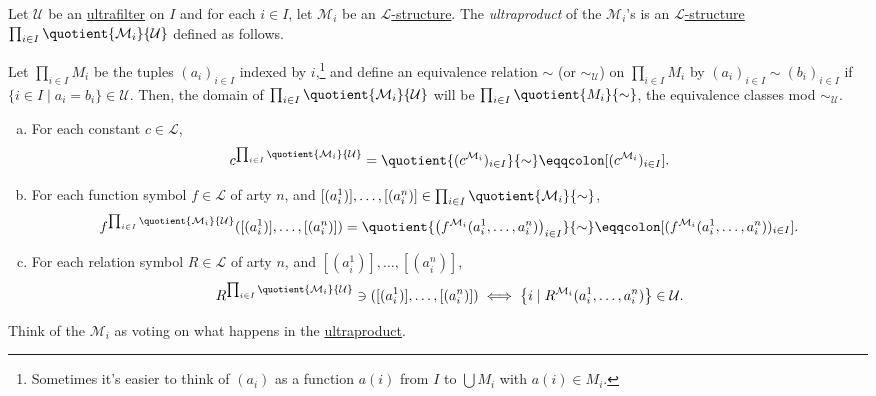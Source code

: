 \begin{definition}[Ultraproduct]\label{def:ultraproduct}
	Let \(\mathcal{U} \) be an \hyperref[def:ultrafilter]{ultrafilter} on \(I\) and for each \(i\in I\), let \(\mathcal{M} _i\) be an \hyperref[def:structure]{\(\mathcal{L} \)-structure}. The \emph{ultraproduct} of the \(\mathcal{M} _i\)'s is an \hyperref[def:structure]{\(\mathcal{L} \)-structure} \(\prod_{i\in I} \quotient{\mathcal{M} _i}{\mathcal{U}} \) defined as follows.

	Let \(\prod_{i\in I} M_i\) be the tuples \((a_i)_{i\in I}\) indexed by \(i\),\footnote{Sometimes it's easier to think of \((a_i)\) as a function \(a(i)\) from \(I\) to \(\bigcup M_i\) with \(a(i)\in M_i\).} and define an equivalence relation \(\sim \) (or \(\sim _{\mathcal{U} }\)) on \(\prod_{i\in I} M_i\) by \((a_i)_{i\in I} \sim (b_i)_{i\in I}\) if \(\{i\in I \mid a_i = b_i\}\in \mathcal{U} \). Then, the domain of \(\prod_{i\in I} \quotient{\mathcal{M} _i}{\mathcal{U}} \) will be \(\prod_{i\in I} \quotient{M_i}{\sim } \), the equivalence classes mod \(\sim _\mathcal{U} \).
	\begin{enumerate}[(a)]
		\item For each constant \(c\in \mathcal{L} \),
		      \[
			      c^{\prod_{i\in I} \quotient{\mathcal{M} _i}{\mathcal{U} } }
			      = \quotient{(c^{\mathcal{M} _i})_{i\in I}}{\sim }
			      \eqqcolon [(c^{\mathcal{M} _i})_{i\in I}].
		      \]
		\item For each function symbol \(f\in \mathcal{L} \) of arty \(n\), and \([(a_i^1)], \dots , [(a_i^n)] \in \prod_{i\in I} \quotient{\mathcal{M} _i}{\sim } \),
		      \[
			      f^{\prod_{i\in I} \quotient{\mathcal{M} _i}{\mathcal{U} } } ([(a^1_i)], \dots , [(a^n_i)])
			      = \quotient{\left( f^{\mathcal{M} _i} (a_i^1, \dots , a_i^n) \right) _{i\in I}}{\sim }
			      \eqqcolon [(f^{\mathcal{M} _i} (a^1_i, \dots , a^n_i))_{i\in I}].
		      \]
		\item For each relation symbol \(R\in \mathcal{L} \) of arty \(n\), and \([(a_i^1)], \dots , [(a_i^n)]\),
		      \[
			      R^{\prod_{i\in I} \quotient{\mathcal{M} _i}{\mathcal{U} } } \ni ([(a_i^1)], \dots , [(a_i^n)])
			      \iff \left\{ i \mid R^{\mathcal{M} _i} (a_i^1, \dots , a_i^n) \right\} \in \mathcal{U} .
		      \]
	\end{enumerate}
\end{definition}

\begin{intuition}
	Think of the \(\mathcal{M} _i\) as voting on what happens in the \hyperref[def:ultraproduct]{ultraproduct}.
\end{intuition}

